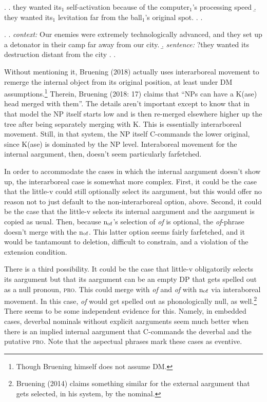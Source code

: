 \documentclass[12pt]{article}
\newcommand*{\textsub}[1]{\ensuremath{_\textrm{{\scriptsize #1}}}}
\begin{document}
\singlespacing

\ex. 
\a. they wanted its$_1$ self-activation because of the computer$_1$'s processing speed
\b. they wanted its$_1$ levitation far from the ball$_1$'s original spot.
\z. \z.

\ex.
\a. \textit{context:} Our enemies were extremely technologically advanced, and they set up a detonator in their camp far away from our city.
\b. \textit{sentence:} ?they wanted its destruction distant from the city
\z. \z. \par

\doublespacing

Without mentioning it, Bruening (2018) actually uses interarboreal movement to remerge the internal object from its original position, at least under DM assumptions.\footnote{ Though Bruening himself does not assume DM.} Therein, Bruening (2018: 17) claims that ``NPs can have a K(ase) head merged with them''. The details aren't important except to know that in that model the NP itself starts low and is then re-merged elsewhere higher up the tree after being separately merging with K. This is essentially interarboreal movement. Still, in that system, the NP itself C-commands the lower original, since K(ase) is dominated by the NP level. Interaboreal movement for the internal aargument, then, doesn't seem particularly farfetched.

In order to accommodate the cases in which the internal aargument doesn't show up, the interarboreal case is somewhat more complex. First, it could be the case that the little-v could still optionally select its aargument, but this would offer no reason not to just default to the non-interarboreal option, above. Second, it could be the case that the little-v selects its internal aargument and the aargument is copied as usual. Then, because n\textsub{of}'s selection of \textit{of} is optional, the \textit{of}-phrase doesn't merge with the n\textsub{of}. This latter option seems fairly farfetched, and it would be tantamount to deletion, difficult to constrain, and a violation of the extension condition.

There is a third possibility. It could be the case that little-v obligatorily selects its aargument but that its aargument can be an empty DP that gets spelled out as a null pronoun, \textsc{pro}. This could merge with \textit{of} and \textit{of} with n\textsub{of} via interaboreal movement. In this case, \textit{of} would get spelled out as phonologically null, as well.\footnote{ Bruening (2014) claims something similar for the external aargument that gets selected, in his system, by the nominal.} There seems to be some independent evidence for this. Namely, in embedded cases, deverbal nominals without explicit aarguments seem much better when there is an implied internal aargument that C-commands the deverbal and the putative \textsc{pro}. Note that the aspectual phrases mark these cases as eventive.
\end{document}
